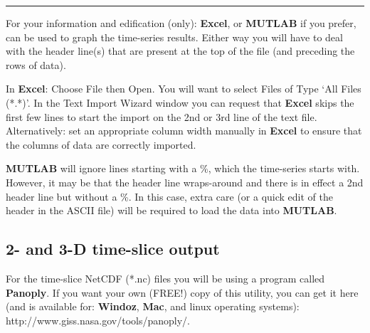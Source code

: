 \documentclass[11pt,fleqn]{book} %
\begin{document}
\vspace{1mm}
\noindent\rule{4cm}{0.1mm}
\vspace{2mm}

\noindent For your information and edification (only): \textbf{Excel}, or \textbf{MUTLAB} if you prefer, can be used to graph the time-series results. Either way you will have to deal with the header line(s) that are present at the top of the file (and preceding the rows of data).

In \textbf{Excel}: Choose \textsf{\footnotesize File} then \textsf{\footnotesize Open}.  You will want to select \textsf{\footnotesize Files of Type} ‘\textsf{\footnotesize All Files (*.*)}’. In the \textsf{\footnotesize Text Import Wizard} window you can request that \textbf{Excel} skips the first few lines to start the import on the 2nd or 3rd line of the text file. Alternatively: set an appropriate column width manually in \textbf{Excel} to ensure that the columns of data are correctly imported.

\textbf{MUTLAB} will ignore lines starting with a \textsf{\footnotesize \%}, which the time-series starts with. However, it may be that the header line wraps-around and there is in effect a 2nd header line but without a \textsf{\footnotesize \%}. In this case, extra care (or a quick edit of the header in the ASCII file) will be required to load the data into \textbf{MUTLAB}.


\subsection{2- and 3-D time-slice output}

For the time-slice NetCDF (*.nc) files you will be using a program called \textbf{Panoply}. If you want your own (FREE!) copy of this utility, you can get it here (and is available for: \textbf{Windoz}, \textbf{Mac}, and linux operating systems): http://www.giss.nasa.gov/tools/panoply/.
\end{document}
